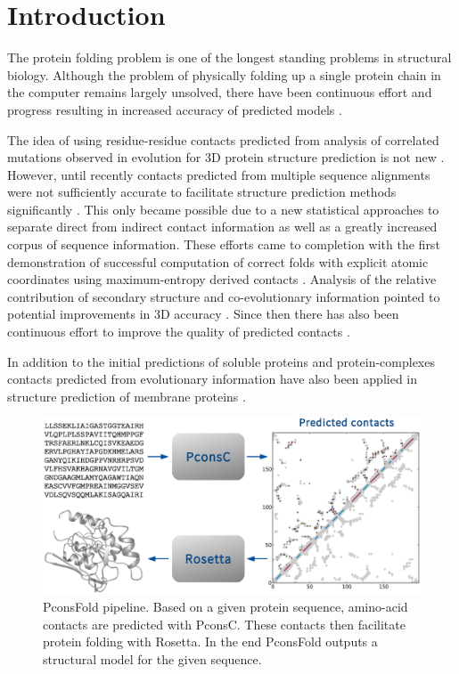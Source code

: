 \documentclass{bioinfo}
\begin{document}
\section{Introduction}
The protein folding problem is one of the
longest standing problems in structural biology. Although the problem
of physically folding up a single protein chain in the computer
remains largely unsolved, there have been continuous effort and
progress resulting in increased accuracy of predicted models
\cite[]{kryshtafovych_CASP10_2013}.

The idea of using residue-residue contacts predicted from analysis of
correlated mutations observed in evolution for 3D protein structure
prediction is not new
\cite[]{gobel_correlated_1994,Neher8278414,Hatrick16649265,Shindyalov_can_1994,Vendruscolo9377713}.
However, until recently contacts predicted from multiple sequence
alignments were not sufficiently accurate to facilitate structure
prediction methods significantly \cite[]{marks_protein_2012}.  This
only became possible due to a new statistical approaches to separate
direct from indirect contact information \cite[]{Lapedes1999,
  Lapedes2002, Weigt19116270,burger_disentangling_2010,
  morcos_direct-coupling_2011, marks_protein_2011} as well as a
greatly increased corpus of sequence information. These efforts came
to completion with the first demonstration of successful computation
of correct folds with explicit atomic coordinates using
maximum-entropy derived contacts \cite[]{marks_protein_2011}. Analysis
of the relative contribution of secondary structure and
co-evolutionary information pointed to potential improvements in 3D
accuracy \cite[]{Sulkowska22691493}. Since then there has also been
continuous effort to improve the quality of predicted contacts
\cite[]{jones_psicov:_2012, ekeberg_improved_2013,
  skwark_PconsC:_2013}.

In addition to the initial predictions of soluble proteins \cite[]{marks_protein_2011}
and protein-complexes \cite[]{Schug20018738}  contacts predicted from evolutionary information
have also been applied in structure prediction of membrane proteins
\cite[]{hopf_three-dimensional_2012, nugent_accurate_2012}.


\begin{figure}[!tpb]%
\centerline{\includegraphics[scale=0.35]{figures/pipeline.eps}}
\caption{PconsFold pipeline. Based on a given protein sequence,
 amino-acid contacts are predicted with PconsC. These contacts then
 facilitate protein folding with Rosetta. In the end PconsFold
 outputs a structural model for the given
 sequence.}\label{fig:pipeline} 
\end{figure}
\end{document}
